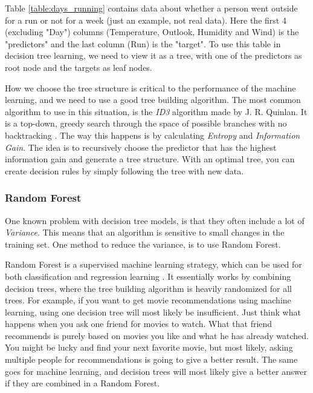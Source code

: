 
Table \ref{table:days_running} contains data about whether a person went outside for a run or not for a week (just an example, not real data). 
Here the first 4 (excluding "Day") columns (Temperature, Outlook, Humidity and Wind) is the "predictors" and the last column (Run) is the "target". 
To use this table in decision tree learning, we need to view it as a tree, with one of the predictors as root node and the targets as leaf nodes. 

How we choose the tree structure is critical to the performance of the machine learning, and we need to use a good tree building algorithm. 
The most common algorithm to use in this situation, is the \textit{ID3} algorithm made by J. R. Quinlan. It is a top-down, 
greedy search through the space of possible branches with no backtracking \cite{decision_tree}. The way this happens is by calculating \textit{Entropy} 
and \textit{Information Gain}. The idea is to recursively choose the predictor that has the highest information gain and generate a tree structure.
With an optimal tree, you can create decision rules by simply following the tree with new data.

\subsubsection{Random Forest}
One known problem with decision tree models, is that they often include a lot of \textit{Variance}. This means that an algorithm is sensitive to 
small changes in the training set. One method to reduce the variance, is to use Random Forest. 

Random Forest is a supervised machine learning strategy, which can be used for both classification and regression learning \cite{random_forest}. It essentially works
by combining decision trees, where the tree building algorithm is heavily randomized for all trees. For example, if you want to get movie recommendations
using machine learning, using one decision tree will most likely be insufficient. Just think what happens when you ask one friend for movies to watch.
What that friend recommends is purely based on movies you like and what he has already watched. You might be lucky and find your next favorite movie,
but most likely, asking multiple people for recommendations is going to give a better result. The same goes for machine learning, and decision trees 
will most likely give a better answer if they are combined in a Random Forest.

